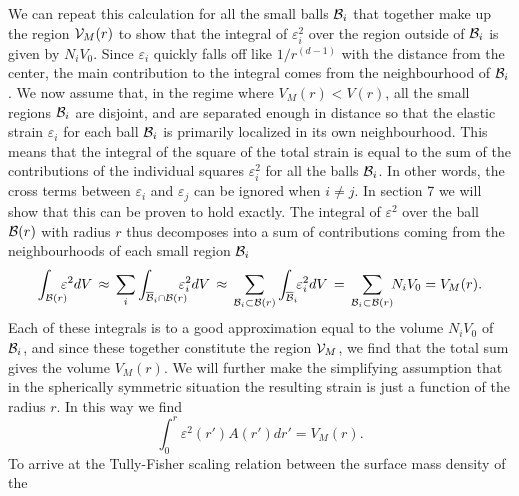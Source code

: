 \documentclass[a4paper,12pt]{article}
\begin{document}
We can repeat this calculation for all the small balls ${\cal B}_i$ that together make up the region ${\cal V}_M(r)$ to show that the integral of $\varepsilon_i^2$ over the region outside of ${\cal B}_i$ is given by $N_iV_0$.  Since $\varepsilon_i$ quickly falls off like $1/r^{(d-1)}$ with the distance from the center, the main contribution to the integral comes from the neighbourhood of ${\cal B}_i$.   
We now assume that, in the regime where $V_M(r)<V(r)$,   all the small regions ${\cal B}_i$ are disjoint, and are separated enough in distance so that the elastic strain $\varepsilon_i$ for each ball ${\cal B}_i$ is primarily localized in its own neighbourhood.  This means that the integral of the square of the total strain is equal to the sum of the contributions of the individual squares $\varepsilon_i^2$ for all the balls ${\cal B}_i$. In other words, the cross terms between $\varepsilon_i$ and $\varepsilon_j$ can be ignored when $i\neq j$. In section 7 we will show that this can be proven to hold exactly.  The integral of $\varepsilon^2$ over the ball ${\cal B}(r)$ with radius $r$ thus decomposes into a sum of contributions coming from the neighbourhoods of each small region ${\cal B}_i$
\begin{equation}
\int_{\strut {{\cal B}(r)}}\!\!\!\!\varepsilon^2 dV  \, \approx\,  \sum_i \int_{\strut {\overline{{\cal B}}_i \cap \cal B}(r) }\!\!\!\!\!\varepsilon_i^2 dV \,\approx\, \sum_{{\cal B}_i \subset  {\cal B}(r)} \int_{\strut {\overline{{\cal B}}_i} }\!\!\varepsilon_i^2 dV \,  =\, \sum_{{\cal B}_i \subset  {\cal B}(r)}  \!\!N_iV_0 = V_M(r) . 
\end{equation}
Each of these integrals is to a good approximation equal to the volume $N_i V_0$ of ${\cal B}_i$, and since these together constitute the region ${\cal V}_M$, we find that the total sum gives the volume $V_M(r)$.  We will further make the simplifying assumption that in the spherically symmetric situation   the resulting strain is just a function of the radius $r$.  In this way we find 
\begin{equation}
\label{epsilon4}
\int_0^r \!\!\varepsilon^2(r') A(r') dr' 
= V_M(r) .
\end{equation}
To arrive at the Tully-Fisher scaling relation between the surface mass density of the 
\end{document}
